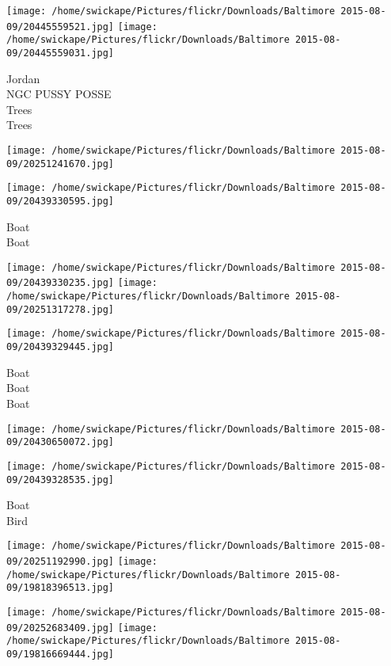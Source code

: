 \documentclass[10pt,letterpaper]{article}
\begin{document}
\texttt{[image: /home/swickape/Pictures/flickr/Downloads/Baltimore 2015-08-09/20445559521.jpg]}
\texttt{[image: /home/swickape/Pictures/flickr/Downloads/Baltimore 2015-08-09/20445559031.jpg]}

Jordan\\
NGC PUSSY POSSE\\
Trees\\
Trees\\
\pagebreak

\texttt{[image: /home/swickape/Pictures/flickr/Downloads/Baltimore 2015-08-09/20251241670.jpg]}

\vspace{0.25in}
\texttt{[image: /home/swickape/Pictures/flickr/Downloads/Baltimore 2015-08-09/20439330595.jpg]}

Boat\\
Boat\\
\pagebreak

\texttt{[image: /home/swickape/Pictures/flickr/Downloads/Baltimore 2015-08-09/20439330235.jpg]}
\texttt{[image: /home/swickape/Pictures/flickr/Downloads/Baltimore 2015-08-09/20251317278.jpg]}

\vspace{0.25in}
\texttt{[image: /home/swickape/Pictures/flickr/Downloads/Baltimore 2015-08-09/20439329445.jpg]}

Boat\\
Boat\\
Boat\\
\pagebreak

\texttt{[image: /home/swickape/Pictures/flickr/Downloads/Baltimore 2015-08-09/20430650072.jpg]}

\vspace{0.25in}
\texttt{[image: /home/swickape/Pictures/flickr/Downloads/Baltimore 2015-08-09/20439328535.jpg]}

Boat\\
Bird\\
\pagebreak

\texttt{[image: /home/swickape/Pictures/flickr/Downloads/Baltimore 2015-08-09/20251192990.jpg]}
\texttt{[image: /home/swickape/Pictures/flickr/Downloads/Baltimore 2015-08-09/19818396513.jpg]}

\texttt{[image: /home/swickape/Pictures/flickr/Downloads/Baltimore 2015-08-09/20252683409.jpg]}
\texttt{[image: /home/swickape/Pictures/flickr/Downloads/Baltimore 2015-08-09/19816669444.jpg]}
\end{document}
